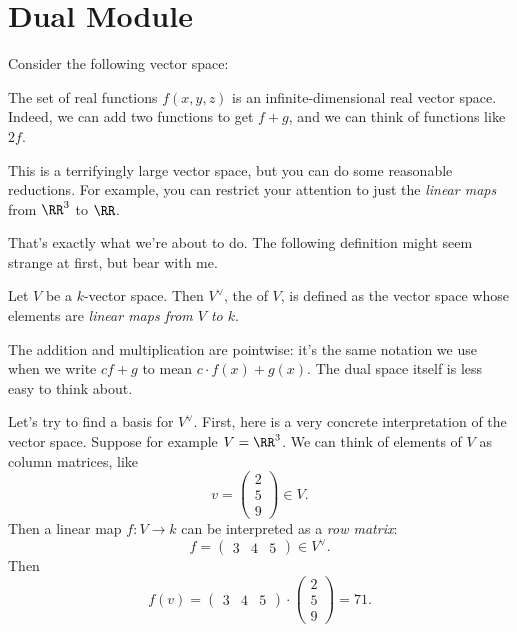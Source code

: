 \section{Dual Module}

Consider the following vector space:
\begin{example}
	The set of real functions $f(x,y,z)$ is an
	infinite-dimensional real vector space.
	Indeed, we can add two functions to get $f+g$,
	and we can think of functions like $2f$.
\end{example}
This is a terrifyingly large vector space,
but you can do some reasonable reductions.
For example, you can restrict your attention to just
the \emph{linear maps} from $\RR^3$ to $\RR$.

That's exactly what we're about to do.
The following definition might seem strange at first, but bear with me.

\begin{definition}
	Let $V$ be a $k$-vector space.
	Then $V^\vee$, the  of $V$, is defined
	as the vector space whose elements are \emph{linear maps from $V$ to $k$}.
\end{definition}
The addition and multiplication are pointwise:
it's the same notation we use when we write $cf+g$ to mean $c \cdot f(x) + g(x)$.
The dual space itself is less easy to think about.

Let's try to find a basis for $V^\vee$.
First, here is a very concrete interpretation of the vector space.
Suppose for example $V = \RR^3$.
We can think of elements of $V$ as column matrices, like
\[ v = \left(
	\begin{array}{c}
		2 \\ 5 \\ 9
	\end{array}
	\right) \in V. \]
Then a linear map $f : V \to k$ can be interpreted as a \emph{row matrix}:
\[
	f = \left(
	\begin{array}{ccc}
		3 & 4 & 5
	\end{array}
	\right) \in V^\vee. \]
Then
\[
	f(v)
	= \left(
	\begin{array}{ccc}
		3 & 4 & 5
	\end{array}
	\right)
	\cdot
	\left(
	\begin{array}{c}
		2 \\ 5 \\ 9
	\end{array}
	\right)
	= 71. \]

